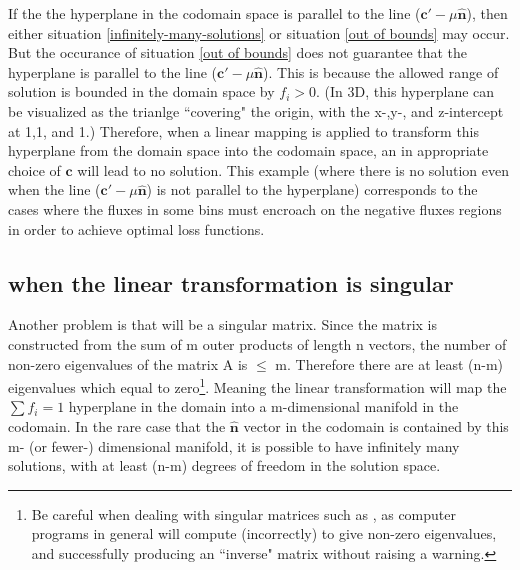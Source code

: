 \documentclass[a4paper, 12pt]{article}
\newcommand{\matr}[1]{\uuline{\bf{#1}}}
\newcommand{\ve}[1]{\boldsymbol{#1}}
\newcommand{\n}[0]{\ve{\hat{n}}}
\begin{document}
\begin{appendices}
If the the hyperplane in the codomain space is parallel to the line ($\ve{c'}-\mu\n$), then either situation \ref{infinitely-many-solutions} or situation \ref{out of bounds} may occur.
But the occurance of situation \ref{out of bounds} does not guarantee that the hyperplane is parallel to the line ($\ve{c'}-\mu\n$).
This is because the allowed range of solution is bounded in the domain space by $f_i>0$.
(In 3D, this hyperplane can be visualized as the trianlge ``covering" the origin, with the x-,y-, and z-intercept at 1,1, and 1.)
Therefore, when a linear mapping is applied to transform this hyperplane from the domain space into the codomain space, an in appropriate choice of $\ve{c}$ will lead to no solution.
This example (where there is no solution even when the line ($\ve{c'}-\mu\n$) is not parallel to the hyperplane) corresponds to the cases where the fluxes in some bins must encroach on the negative fluxes regions in order to achieve optimal loss functions.

\subsection{when the linear transformation is singular}\label{when the linear transformation is singular}
Another problem is that \matr{A} will be a singular matrix. Since the matrix \matr{A} is constructed from the sum of m outer products of length n vectors, the number of non-zero eigenvalues of the matrix A is $\le$ m. Therefore there are at least (n-m) eigenvalues which equal to zero\footnote{Be careful when dealing with singular matrices such as \matr{A}, as computer programs in general will compute (incorrectly) to give non-zero eigenvalues, and successfully producing an ``inverse" matrix without raising a warning.}.%
Meaning the linear transformation will map the $\sum f_i =1$ hyperplane in the domain into a m-dimensional manifold in the codomain. In the rare case that the $\n$ vector in the codomain is contained by this m- (or fewer-) dimensional manifold, it is possible to have infinitely many solutions, with at least (n-m) degrees of freedom in the solution space.


\end{appendices}
\end{document}
